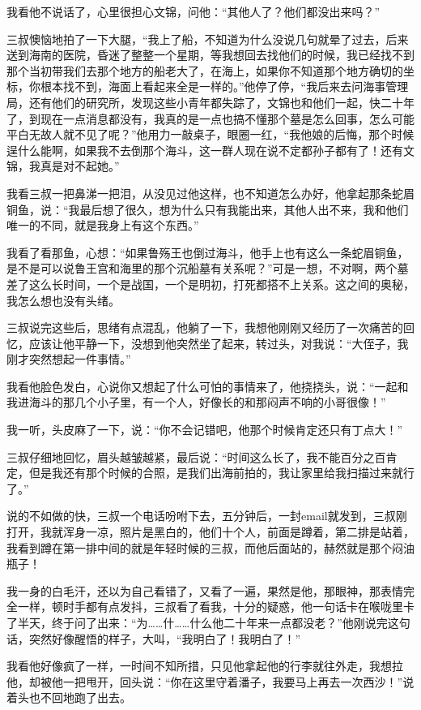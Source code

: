 我看他不说话了，心里很担心文锦，问他：“其他人了？他们都没出来吗？”

三叔懊恼地拍了一下大腿，“我上了船，不知道为什么没说几句就晕了过去，后来送到海南的医院，昏迷了整整一个星期，等我想回去找他们的时候，我已经找不到那个当初带我们去那个地方的船老大了，在海上，如果你不知道那个地方确切的坐标，你根本找不到，海面上看起来全是一样的。”他停了停，“我后来去问海事管理局，还有他们的研究所，发现这些小青年都失踪了，文锦也和他们一起，快二十年了，到现在一点消息都没有，我真的是一点也搞不懂那个墓是怎么回事，怎么可能平白无故人就不见了呢？”他用力一敲桌子，眼圈一红，“我他娘的后悔，那个时候逞什么能啊，如果我不去倒那个海斗，这一群人现在说不定都孙子都有了！还有文锦，我真是对不起她。”

我看三叔一把鼻涕一把泪，从没见过他这样，也不知道怎么办好，他拿起那条蛇眉铜鱼，说：“我最后想了很久，想为什么只有我能出来，其他人出不来，我和他们唯一的不同，就是我身上有这个东西。”

我看了看那鱼，心想：“如果鲁殇王也倒过海斗，他手上也有这么一条蛇眉铜鱼，是不是可以说鲁王宫和海里的那个沉船墓有关系呢？”可是一想，不对啊，两个墓差了这么长时间，一个是战国，一个是明初，打死都搭不上关系。这之间的奥秘，我怎么想也没有头绪。

三叔说完这些后，思绪有点混乱，他躺了一下，我想他刚刚又经历了一次痛苦的回忆，应该让他平静一下，没想到他突然坐了起来，转过头，对我说：“大侄子，我刚才突然想起一件事情。”

我看他脸色发白，心说你又想起了什么可怕的事情来了，他挠挠头，说：“一起和我进海斗的那几个小子里，有一个人，好像长的和那闷声不响的小哥很像！”

我一听，头皮麻了一下，说：“你不会记错吧，他那个时候肯定还只有丁点大！”

三叔仔细地回忆，眉头越皱越紧，最后说：“时间这么长了，我不能百分之百肯定，但是我还有那个时候的合照，是我们出海前拍的，我让家里给我扫描过来就行了。”

说的不如做的快，三叔一个电话吩咐下去，五分钟后，一封email就发到，三叔刚打开，我就浑身一凉，照片是黑白的，他们十个人，前面是蹲着，第二排是站着，我看到蹲在第一排中间的就是年轻时候的三叔，而他后面站的，赫然就是那个闷油瓶子！

我一身的白毛汗，还以为自己看错了，又看了一遍，果然是他，那眼神，那表情完全一样，顿时手都有点发抖，三叔看了看我，十分的疑惑，他一句话卡在喉咙里卡了半天，终于问了出来：“为……什……什么他二十年来一点都没老？”他刚说完这句话，突然好像醒悟的样子，大叫，“我明白了！我明白了！”

我看他好像疯了一样，一时间不知所措，只见他拿起他的行李就往外走，我想拉他，却被他一把甩开，回头说：“你在这里守着潘子，我要马上再去一次西沙！”说着头也不回地跑了出去。

